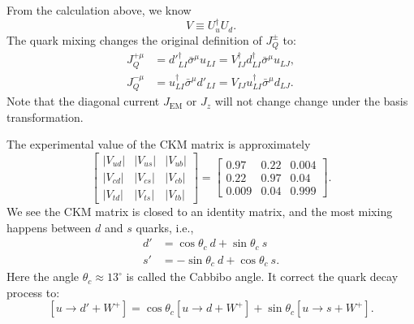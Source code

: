 From the calculation above, we know
\begin{equation}
	V \equiv U^\dagger_u U_d.
\end{equation}
The quark mixing changes the original definition of $J^\pm_Q$ to:
\begin{equation}
\begin{aligned}
	J^{+\mu}_Q &= {d'}_{LI}^{\dagger} \bar\sigma^\mu u_{LI}
		= V^\dagger_{IJ} d_{LI}^\dagger \bar\sigma^\mu u_{LJ}, \\
	J^{-\mu}_Q &= u_{LI}^\dagger \bar\sigma^\mu d'_{LI}
		= V_{IJ} u_{LI}^\dagger \bar\sigma^\mu d_{LJ}.
\end{aligned}
\end{equation}
Note that the diagonal current $J_{\mathrm{EM}}$ or $J_z$ will not change change under the basis transformation.

The experimental value of the CKM matrix is approximately
\begin{equation}
	\begin{bmatrix}
		\left|V_{u d}\right| & \left|V_{u s}\right| & \left|V_{u b}\right| \\
		\left|V_{c d}\right| & \left|V_{c s}\right| & \left|V_{c b}\right| \\
		\left|V_{t d}\right| & \left|V_{t s}\right| & \left|V_{t b}\right|
	\end{bmatrix} =
	\begin{bmatrix}
		0.97 & 0.22 & 0.004 \\
		0.22 & 0.97 & 0.04 \\
		0.009 & 0.04 & 0.999
	\end{bmatrix}.
\end{equation}
We see the CKM matrix is closed to an identity matrix, and the most mixing happens between $d$ and $s$ quarks, i.e.,
\begin{equation}
\begin{aligned}
	d' &= \cos\theta_c\ d + \sin\theta_c\ s \\
	s' &= -\sin\theta_c\ d + \cos\theta_c\ s.
\end{aligned}
\end{equation}
Here the angle $\theta_c \approx 13^{\circ}$ is called the Cabbibo angle.
It correct the quark decay process to:
\begin{equation}
	\left[u \rightarrow d' + W^+\right]
	= \cos\theta_c \left[u \rightarrow d + W^+\right] + \sin\theta_c \left[u \rightarrow s + W^+\right].
\end{equation}


